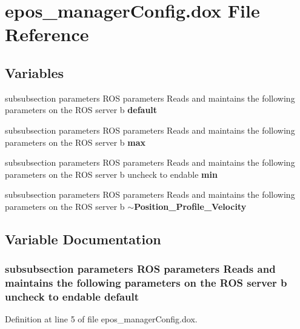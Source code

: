 \section{epos\-\_\-manager\-Config.\-dox \-File \-Reference}
\label{epos__managerConfig_8dox}
\subsection*{\-Variables}
\begin{DoxyCompactItemize}
\item 
subsubsection parameters \-R\-O\-S \*
parameters \-Reads and maintains \*
the following parameters on \*
the \-R\-O\-S server b {\bf default}
\item 
subsubsection parameters \-R\-O\-S \*
parameters \-Reads and maintains \*
the following parameters on \*
the \-R\-O\-S server b {\bf max}
\item 
subsubsection parameters \-R\-O\-S \*
parameters \-Reads and maintains \*
the following parameters on \*
the \-R\-O\-S server b uncheck to \*
endable {\bf min}
\item 
subsubsection parameters \-R\-O\-S \*
parameters \-Reads and maintains \*
the following parameters on \*
the \-R\-O\-S server b {\bf $\sim$\-Position\-\_\-\-Profile\-\_\-\-Velocity}
\end{DoxyCompactItemize}


\subsection{\-Variable \-Documentation}
\subsubsection[{default}]{\setlength{\rightskip}{0pt plus 5cm}subsubsection parameters \-R\-O\-S parameters \-Reads and maintains the following parameters on the \-R\-O\-S server b uncheck to endable {\bf default}}\label{epos__managerConfig_8dox_adb36a153a297a36f55ff4df8c7ddfbf7}


\-Definition at line 5 of file epos\-\_\-manager\-Config.\-dox.

